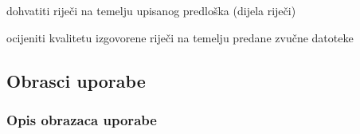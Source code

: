 \begin{packed_enum}
\begin{packed_enum}
				\end{packed_enum}
				
				\item  {}
				
				\begin{packed_enum}
					
					\item dohvatiti riječi na temelju upisanog predloška (dijela riječi)
					
				\end{packed_enum}
				
				\item  {}
				
				\begin{packed_enum}
					
					\item ocijeniti kvalitetu izgovorene riječi na temelju predane zvučne datoteke
					
				\end{packed_enum}
				
			\end{packed_enum}
			
			\eject 
			
			
				
			\subsection{Obrasci uporabe}
				
				
				\subsubsection{Opis obrazaca uporabe}
					


